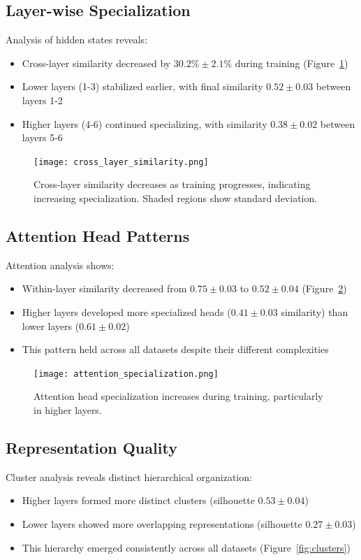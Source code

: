 \documentclass{article} %
\begin{document}
\subsection{Layer-wise Specialization}
Analysis of hidden states reveals:
\begin{itemize}
    \item Cross-layer similarity decreased by $30.2\% \pm 2.1\%$ during training (Figure~\ref{fig:cross_layer})
    \item Lower layers (1-3) stabilized earlier, with final similarity $0.52 \pm 0.03$ between layers 1-2
    \item Higher layers (4-6) continued specializing, with similarity $0.38 \pm 0.02$ between layers 5-6
\end{itemize}

\begin{figure}[h]
    \centering
    \texttt{[image: cross\_layer\_similarity.png]}
    \caption{Cross-layer similarity decreases as training progresses, indicating increasing specialization. Shaded regions show standard deviation.}
    \label{fig:cross_layer}
\end{figure}

\subsection{Attention Head Patterns}
Attention analysis shows:
\begin{itemize}
    \item Within-layer similarity decreased from $0.75 \pm 0.03$ to $0.52 \pm 0.04$ (Figure~\ref{fig:attention})
    \item Higher layers developed more specialized heads ($0.41 \pm 0.03$ similarity) than lower layers ($0.61 \pm 0.02$)
    \item This pattern held across all datasets despite their different complexities
\end{itemize}

\begin{figure}[h]
    \centering
    \texttt{[image: attention\_specialization.png]}
    \caption{Attention head specialization increases during training, particularly in higher layers.}
    \label{fig:attention}
\end{figure}

\subsection{Representation Quality}
Cluster analysis reveals distinct hierarchical organization:
\begin{itemize}
    \item Higher layers formed more distinct clusters (silhouette $0.53 \pm 0.04$)
    \item Lower layers showed more overlapping representations (silhouette $0.27 \pm 0.03$)
    \item This hierarchy emerged consistently across all datasets (Figure~\ref{fig:clusters})
\end{itemize}
\end{document}
